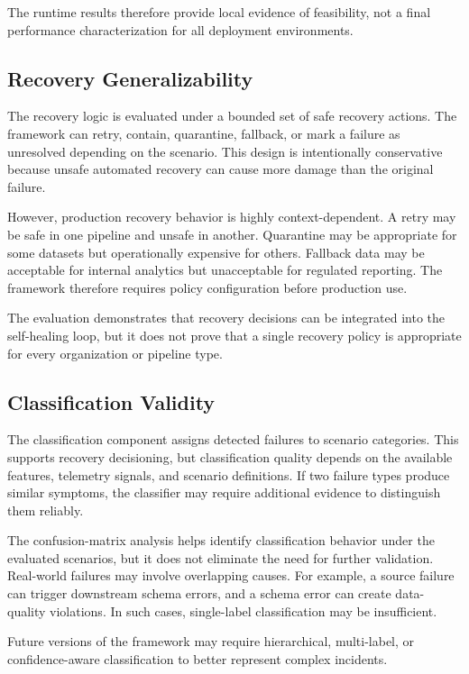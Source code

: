 The runtime results therefore provide local evidence of feasibility, not a final performance characterization for all deployment environments.

\subsection{Recovery Generalizability}

The recovery logic is evaluated under a bounded set of safe recovery actions. The framework can retry, contain, quarantine, fallback, or mark a failure as unresolved depending on the scenario. This design is intentionally conservative because unsafe automated recovery can cause more damage than the original failure.

However, production recovery behavior is highly context-dependent. A retry may be safe in one pipeline and unsafe in another. Quarantine may be appropriate for some datasets but operationally expensive for others. Fallback data may be acceptable for internal analytics but unacceptable for regulated reporting. The framework therefore requires policy configuration before production use.

The evaluation demonstrates that recovery decisions can be integrated into the self-healing loop, but it does not prove that a single recovery policy is appropriate for every organization or pipeline type.

\subsection{Classification Validity}

The classification component assigns detected failures to scenario categories. This supports recovery decisioning, but classification quality depends on the available features, telemetry signals, and scenario definitions. If two failure types produce similar symptoms, the classifier may require additional evidence to distinguish them reliably.

The confusion-matrix analysis helps identify classification behavior under the evaluated scenarios, but it does not eliminate the need for further validation. Real-world failures may involve overlapping causes. For example, a source failure can trigger downstream schema errors, and a schema error can create data-quality violations. In such cases, single-label classification may be insufficient.

Future versions of the framework may require hierarchical, multi-label, or confidence-aware classification to better represent complex incidents.

